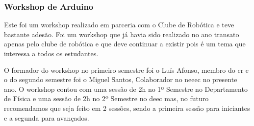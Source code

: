 
\subsubsection{Workshop de Arduino}

Este foi um workshop realizado em parceria com o Clube de Robótica e teve bastante adesão. Foi um workshop que já havia sido realizado no ano transato apenas pelo clube de robótica e que deve continuar a existir pois é um tema que interessa a todos os estudantes.

O formador do workshop no primeiro semestre foi o Luís Afonso, membro do \acrshort{cr} e o do segundo semestre foi o Miguel Santos, Colaborador no \acrshort{neeec} no presente ano. O workshop contou com uma sessão de 2h no 1º Semestre no Departamento de Física e uma sessão de 2h no 2º Semestre no \acrshort{deec} mas, no futuro recomendamos que seja feito em 2 sessões, sendo a primeira sessão para iniciantes e a segunda para avançados.